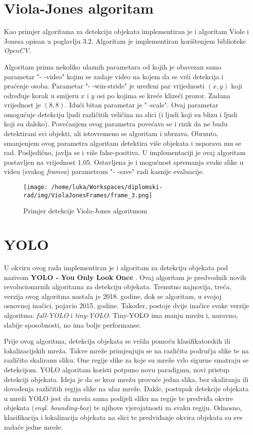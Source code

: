 \section{Viola-Jones algoritam}

Kao primjer algoritama za detekciju objekata implementiran je i algoritam Viole i Jonesa opisan u poglavlju 3.2. Algoritam je implementiran korištenjem biblioteke \textit{OpenCV}.

Algoritam prima nekoliko ulaznih parametara od kojih je obavezan samo parametar "- -video" kojim se zadaje video na kojem da se vrši detekcija i praćenje osoba. Parametar "- -win-stride" je uređeni par vrijednosti $(x, y)$ koji određuje korak u smijeru $x$ i $y$ osi po kojima se kreće klizeći prozor. Zadana vrijednost je $(8, 8)$. Idući bitan parametar je "--scale". Ovaj parametar omogućuje detekciju ljudi različitih veličina na slici (i ljudi koji su blizu i ljudi koji su daleko). Povećanjem ovog parametra povećava se i rizik da ne budu detektirani svi objekti, ali istovremeno se algoritam i ubrzava. Obrnuto, smanjenjem ovog parametra algoritam detektira više objekata i usporava mu se rad. Posljedično, javlja se i više false-positiva. U implementaciji je ovaj algoritam postavljen na vrijednost $1.05$. Ostavljena je i mogućnost spremanja svake slike u videu (svakog \textit{framea}) parametrom "- -save" radi kasnije evaluacije. 

\begin{figure}[htp]
	\centering
	\texttt{[image: /home/luka/Workspaces/diplomski-rad/img/ViolaJonesFrames/frame\_3.png]}
	\caption{Primjer detekcije Viola-Jones algoritmom}
	\label{img:violaJones-detection-example}
\end{figure}

\section{YOLO}

U okviru ovog rada implementiran je i algoritam za detekciju objekata pod nazivom \textbf{YOLO - You Only Look Once} \citep{YOLO}. Ovaj algoritam je predvodnik novih revolucionarnih algoritama za detekciju objekata. Trenutno najnovija, treća, verzija ovog algoritma nastala je 2018. godine, dok se algoritam, u svojoj osnovnoj inačici, pojavio 2015. godine. Također, postoje dvije inačice svake verzije algoritma: \textit{full-YOLO} i \textit{tiny-YOLO}. Tiny-YOLO ima manju mrežu i, naravno, slabije sposobnosti, no ima bolje performanse. 

Prije ovog algoritma, detekcija objekata se vršila pomoću klasifikatorskih ili lokalizacijskih mreža. Takve mreže primjenjuju se na različita područja slike te na različito skaliranu sliku. One regije slike za koje su mreže vrlo sigurne smatraju se detekcijom. YOLO algoritam koristi potpuno novu paradigmu, novi pristup detekciji objekata. Ideja je da se kroz mrežu provuće jedna slika, bez skaliranja ili dovođenja različitih regija slike na ulaz mreže. Dakle, postupak detekcije objekata u mreži YOLO jest da mreža sama podijeli sliku na regije te predviđa okvire objekata (\textit{engl. bounding-box}) te njihove vjerojatnosti za svaku regiju. Odnosno, klasifikacija i lokalizacija objekata na slici te predviđanje okvira objekata su sve zadaće jedne mreže. 

